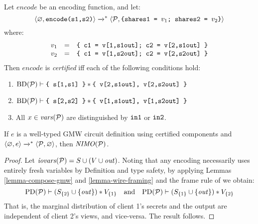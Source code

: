 \begin{definition}
  Let $\mathit{encode}$ be an encoding function, and let:
  $$
  \langle \varnothing,\texttt{encode(s1,s2)} \rangle \xrightarrow{}^{*}
  \langle \mathcal{P},\texttt{\{shares1 = }v_1\texttt{; shares2 = }v_2\texttt{\}} \rangle
  $$
  where:
  $$
  \begin{array}{rcl}
    v_1 &=& \texttt{\{ c1 = v[1,s1out]; c2 = v[2,s1out] \}}\\
    v_2 &=& \texttt{\{ c1 = v[1,s2out]; c2 = v[2,s2out] \}}
  \end{array}
  $$
  Then $\mathit{encode}$ is \emph{certified} iff each of the following conditions hold:
  \begin{enumerate}[\hspace{5mm}i.]
  \item $\mathrm{BD}(\mathcal{P}) \vdash \texttt{\{ s[1,s1] \}} * \texttt{\{ v[2,s1out], v[2,s2out] \}}$
  \item $\mathrm{BD}(\mathcal{P}) \vdash \texttt{\{ s[2,s2] \}} * \texttt{\{ v[1,s1out], v[1,s2out] \}}$
  \item All $x \in \mathit{vars}(\mathcal{P})$ are distinguished by $\texttt{in1}$ or $\texttt{in2}$. 
  \end{enumerate}
\end{definition}

\begin{theorem}
  \label{theorem-gmw-NIMO}
  If $e$ is a well-typed GMW circuit definition using certified
  components and $\langle \varnothing,e \rangle \xrightarrow{}^{*}
  \langle \mathcal{P},\varnothing \rangle$, then $\mathit{NIMO}(\mathcal{P})$.
\end{theorem}
\begin{proof}
  Let $\mathit{iovars}(\mathcal{P}) = S \cup (V \cup \mathit{out})$. Noting that any encoding
  necessarily uses entirely fresh variables by Definition and type
  safety, by applying Lemmas \ref{lemma-compose-gmw} and
  \ref{lemma-wire-framing} and the frame rule of
  \cite{barthe2019probabilistic} we obtain:
  $$
  \mathrm{PD}(\mathcal{P}) \vdash (S_{\{2\}}\cup\{\mathit{out}\}) * V_{\{1\}}
  \quad \text{and} \quad \mathrm{PD}(\mathcal{P}) \vdash (S_{\{1\}}\cup\{\mathit{out}\}) * V_{\{2\}}
  $$
  That is, the marginal distribution of client 1's secrets and the output are independent
  of client 2's views, and vice-versa. The result follows. 
\end{proof}
